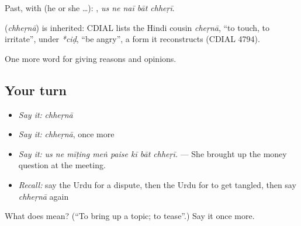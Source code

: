 Past, with  (he or she …):     , \emph{us ne naī bāt chheṛī}.

\begin{cousinweb}
\textbf{} (\emph{chheṛnā}) is inherited: CDIAL lists the Hindi cousin \emph{cheṛnā}, \textquotedblleft{}to touch, to irritate\textquotedblright{}, under \emph{*ciḍ}, \textquotedblleft{}be angry\textquotedblright{}, a form it reconstructs (CDIAL 4794).
\end{cousinweb}

\begin{grammarlens}[title={What you've built}]
One more word for giving reasons and opinions.
\end{grammarlens}

\subsection*{Your turn}
\begin{itemize}
\raggedright
  \item \emph{Say it:} \emph{chheṛnā}
  \item \emph{Say it:} \emph{chheṛnā}, once more
  \item \emph{Say it:} \emph{us ne mīṭing meṅ paise kī bāt chheṛī.} — She brought up the money question at the meeting.
  \item \emph{Recall:} say the Urdu for a dispute, then the Urdu for to get tangled, then say \emph{chheṛnā} again
\end{itemize}

\begin{tcolorbox}[breakable,colback=teal!4,colframe=teal!35!black,title={Before you move on}]
What does  mean? (\textquotedblleft{}To bring up a topic; to tease\textquotedblright{}.) Say it once more.
\end{tcolorbox}
